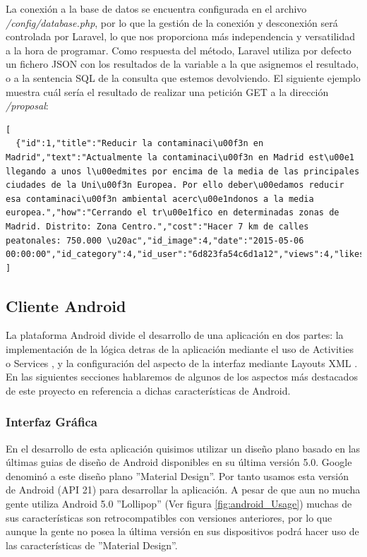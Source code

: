 La conexión a la base de datos se encuentra configurada en el archivo \textit{/config/database.php}, por lo que la gestión de la conexión y desconexión será controlada por Laravel, lo que nos proporciona más independencia y versatilidad a la hora de programar. Como respuesta del método, Laravel utiliza por defecto un fichero JSON con los resultados de la variable a la que asignemos el resultado, o a la sentencia SQL de la consulta que estemos devolviendo. El siguiente ejemplo muestra cuál sería el resultado de realizar una petición GET a la dirección \textit{/proposal}:

\lstset{
  language        = c,    inputencoding=utf8}
\begin{lstlisting}[frame=single]
[
  {"id":1,"title":"Reducir la contaminaci\u00f3n en Madrid","text":"Actualmente la contaminaci\u00f3n en Madrid est\u00e1 llegando a unos l\u00edmites por encima de la media de las principales ciudades de la Uni\u00f3n Europea. Por ello deber\u00edamos reducir esa contaminaci\u00f3n ambiental acerc\u00e1ndonos a la media europea.","how":"Cerrando el tr\u00e1fico en determinadas zonas de Madrid. Distrito: Zona Centro.","cost":"Hacer 7 km de calles peatonales: 750.000 \u20ac","id_image":4,"date":"2015-05-06 00:00:00","id_category":4,"id_user":"6d823fa54c6d1a12","views":4,"likes":3,"not_understood":0,"dislikes":0}
]
\end{lstlisting}

\subsection{Cliente Android}

	La plataforma Android divide el desarrollo de una aplicación en dos partes: la implementación de la lógica detras de la aplicación mediante el uso de Activities \cite{ref:android_activities} o Services \cite{ref:android_service}, y la configuración del aspecto de la interfaz mediante Layouts XML \cite{ref:android_layout}. En las siguientes secciones hablaremos de algunos de los aspectos más destacados de este proyecto en referencia a dichas características de Android.

	\subsubsection{Interfaz Gráfica}
	
		En el desarrollo de esta aplicación quisimos utilizar un diseño plano basado en las últimas guias de diseño de Android disponibles en su última versión 5.0. Google denominó a este diseño plano ''Material Design''. Por tanto usamos esta versión de Android (API 21) para desarrollar la aplicación. A pesar de que aun no mucha gente utiliza Android 5.0 ''Lollipop'' (Ver figura \ref{fig:android_Usage}) muchas de sus características son retrocompatibles con versiones anteriores, por lo que aunque la gente no posea la última versión en sus dispositivos podrá hacer uso de las características de ''Material Design''.
	
